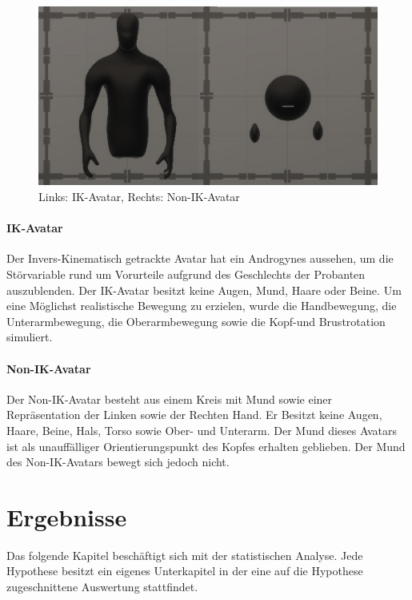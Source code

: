 \documentclass[a4paper,11pt]{article}%
\renewcommand{\\}{\vspace*{0.5\baselineskip} \newline}
\begin{document}
	\begin{figure}[H]
		\begin{footnotesize}
			\includegraphics[width=\textwidth]{Abbildungen/Avatars.JPG}\\
			\caption[Abbildung 1]{Links: IK-Avatar, Rechts: Non-IK-Avatar}
			\label{Framework}
		\end{footnotesize}
	\end{figure}

		\paragraph{IK-Avatar}
Der Invers-Kinematisch getrackte Avatar hat ein Androgynes aussehen, um die Störvariable rund um Vorurteile aufgrund des Geschlechts der Probanten auszublenden. Der IK-Avatar besitzt keine Augen, Mund, Haare oder Beine. 
Um eine Möglichst realistische Bewegung zu erzielen, wurde die Handbewegung, die Unterarmbewegung, die Oberarmbewegung sowie die Kopf-und Brustrotation simuliert.

		\paragraph{Non-IK-Avatar}
Der Non-IK-Avatar besteht aus einem Kreis mit Mund sowie einer Repräsentation der Linken sowie der Rechten Hand. Er Besitzt keine Augen, Haare, Beine, Hals, Torso sowie Ober- und Unterarm. Der Mund dieses Avatars ist als unauffälliger Orientierungspunkt des Kopfes erhalten geblieben. Der Mund des Non-IK-Avatars bewegt sich jedoch nicht. 
	\newpage
	\section{Ergebnisse}
	
	Das folgende Kapitel beschäftigt sich mit der statistischen Analyse. Jede Hypothese besitzt ein eigenes Unterkapitel in der eine auf die Hypothese zugeschnittene Auswertung stattfindet. 
	
\end{document}
